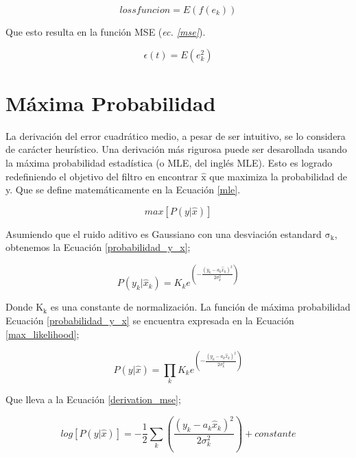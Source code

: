 \documentclass[10pt, a4paper]{report}
\begin{document}
\begin{equation}
    lossfuncion = E\left(f(e_k)\right) \label{loss_function}
\end{equation}

Que esto resulta en la funci\'on \acrshort{MSE} (\emph{ec. \ref{mse}}).

\begin{equation}
    \epsilon(t) = E(e^2_k) \label{mse}
\end{equation}

\section{M\'axima Probabilidad}\label{maximum_likelihood_section}

La derivaci\'on del error cuadr\'atico medio, a pesar de ser intuitivo, se lo
considera de car\'acter heur\'istico. Una derivaci\'on m\'as rigurosa puede ser
desarollada usando la m\'axima probabilidad estad\'istica (o \acrshort{MLE}, del
ingl\'es \acrlong{MLE}). Esto es logrado redefiniendo el objetivo del filtro en
encontrar $\mathrm{\hat{x}}$ que maximiza la probabilidad de y. Que se define
matem\'aticamente en la Ecuaci\'on \ref{mle}.

\begin{equation}
    max\left[P\left(y|\hat{x}\right)\right] \label{mle}
\end{equation}

Asumiendo que el ruido aditivo es Gaussiano con una desviaci\'on estandard
$\mathrm{\sigma_k}$, obtenemos la Ecuaci\'on \ref{probabilidad_y_x};

\begin{equation}
    P\left(y_k|\hat{x}_k\right) = K_ke^{\left(- \frac{(y_k - a_k\hat{x}_k)^2}{2\sigma^2_k}\right)} \label{probabilidad_y_x}
\end{equation}

Donde $\mathrm{K_k}$ es una constante de normalizaci\'on. La funci\'on de
m\'axima probabilidad Ecuaci\'on \ref{probabilidad_y_x} se encuentra expresada
en la Ecuaci\'on \ref{max_likelihood};

\begin{equation}
    P(y|\hat{x}) = \prod_k K_ke^{\left(- \frac{(y_k - a_k\hat{x}_k)^2}{2\sigma^2_k}\right)} \label{max_likelihood}
\end{equation}

Que lleva a la Ecuaci\'on \ref{derivation_mse};

\begin{equation}
    log[P\left(y|\hat{x}\right)] = - \frac{1}{2}\sum_k \left(\frac{(y_k -
    a_k\hat{x}_k)^2}{2\sigma^2_k}\right) + constante \label{derivation_mse}
\end{equation}
\end{document}
